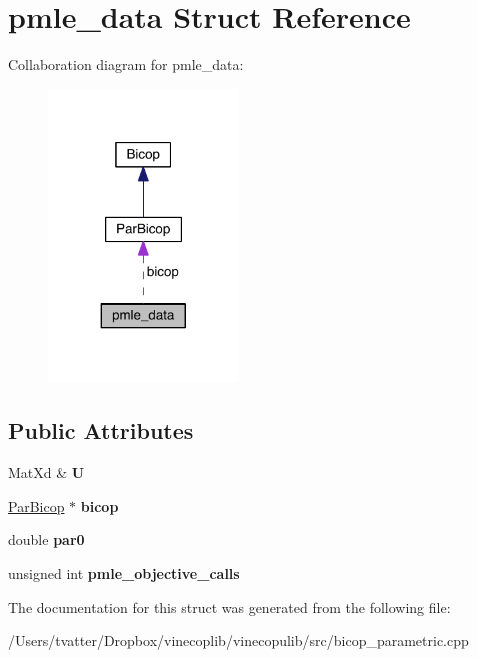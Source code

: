 \hypertarget{structpmle__data}{}\section{pmle\+\_\+data Struct Reference}
\label{structpmle__data}


Collaboration diagram for pmle\+\_\+data\+:
\nopagebreak
\begin{figure}[H]
\begin{center}
\leavevmode
\includegraphics[width=143pt]{structpmle__data__coll__graph}
\end{center}
\end{figure}
\subsection*{Public Attributes}
\begin{DoxyCompactItemize}
\item 
\mbox{\label{structpmle__data_ab21c8922476b40a3b49c58e9238f1581}} 
Mat\+Xd \& {\bfseries U}
\item 
\mbox{\label{structpmle__data_acdec7dbdfa20bb5a0cba126081298c47}} 
\hyperlink{class_par_bicop}{Par\+Bicop} $\ast$ {\bfseries bicop}
\item 
\mbox{\label{structpmle__data_aed0ed1b5a7ced382b18d7891b2dbc565}} 
double {\bfseries par0}
\item 
\mbox{\label{structpmle__data_adde40dfe082325740e7a6e834fb9689c}} 
unsigned int {\bfseries pmle\+\_\+objective\+\_\+calls}
\end{DoxyCompactItemize}


The documentation for this struct was generated from the following file\+:\begin{DoxyCompactItemize}
\item 
/\+Users/tvatter/\+Dropbox/vinecoplib/vinecopulib/src/bicop\+\_\+parametric.\+cpp\end{DoxyCompactItemize}
